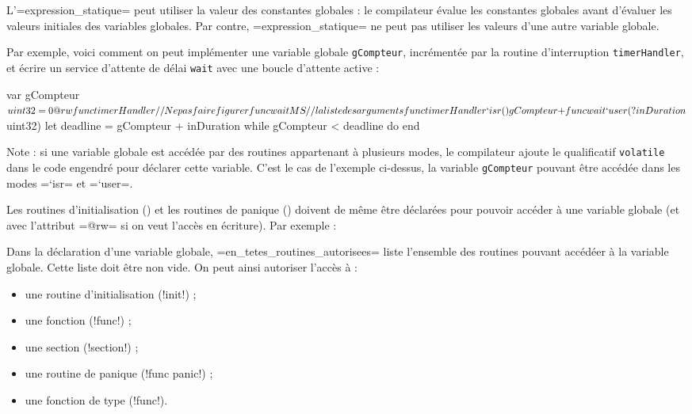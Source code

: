 L'\plm=expression_statique= peut utiliser la valeur des constantes globales : le compilateur évalue les constantes globales avant d'évaluer les valeurs initiales des variables globales. Par contre, \plm=expression_statique= ne peut pas utiliser les valeurs d'une autre variable globale.

Par exemple, voici comment on peut implémenter une variable globale \texttt{gCompteur}, incrémentée par la routine d'interruption \texttt{timerHandler}, et écrire un service d'attente de délai \texttt{wait} avec une boucle d'attente active :

\begin{PLM}
var gCompteur $uint32 = 0 {
  @rw func timerHandler // Ne pas faire figurer
  func waitMS           // la liste des arguments
}

func timerHandler `isr () {
  gCompteur +%
}

func wait `user (?inDuration $uint32) {
  let deadline = gCompteur + inDuration
  while gCompteur < deadline do
  end
}
\end{PLM}

Note : si une variable globale est accédée par des routines appartenant à plusieurs modes, le compilateur ajoute le qualificatif \texttt{volatile} dans le code engendré pour déclarer cette variable. C'est le cas de l'exemple ci-dessus, la variable \texttt{gCompteur} pouvant être accédée dans les modes \plm=`isr= et \plm=`user=.


Les routines d'initialisation () et les routines de panique ()
 doivent de même être déclarées pour pouvoir accéder à une variable globale (et avec l'attribut \plm=@rw= si on veut l'accès en écriture). Par exemple :



Dans la déclaration d'une variable globale, \plm=en_tetes_routines_autorisees= liste l'ensemble des routines pouvant accédéer à la variable globale. Cette liste doit être non vide. On peut ainsi autoriser l'accès à :
\begin{itemize}
  \item une routine d'initialisation (\plm!init!) ;
  \item une fonction (\plm!func!) ;
  \item une section (\plm!section!) ;
  \item une routine de panique (\plm!func panic!) ;
  \item une fonction de type (\plm!func!).
\end{itemize}

